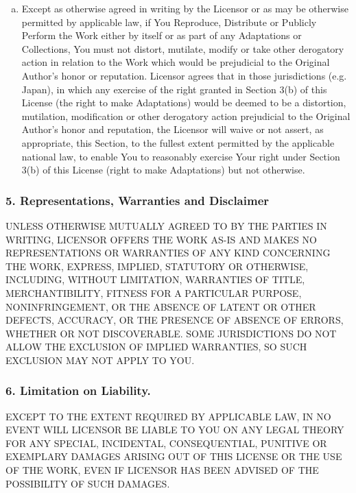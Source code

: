 \begin{enumerate}[a.]
          \item Except as otherwise agreed in writing by the Licensor
          or as may be otherwise permitted by applicable law, if
          You Reproduce, Distribute or Publicly Perform the Work
          either by itself or as part of any Adaptations or
          Collections, You must not distort, mutilate, modify or
          take other derogatory action in relation to the Work
          which would be prejudicial to the Original Author's honor
          or reputation. Licensor agrees that in those
          jurisdictions (e.g. Japan), in which any exercise of the
          right granted in Section 3(b) of this License (the right
          to make Adaptations) would be deemed to be a distortion,
          mutilation, modification or other derogatory action
          prejudicial to the Original Author's honor and
          reputation, the Licensor will waive or not assert, as
          appropriate, this Section, to the fullest extent
          permitted by the applicable national law, to enable You
          to reasonably exercise Your right under Section 3(b) of
          this License (right to make Adaptations) but not
          otherwise.

\end{enumerate}

        \subsubsection{5. Representations, Warranties and
        Disclaimer}

        UNLESS OTHERWISE MUTUALLY AGREED TO BY THE PARTIES IN
        WRITING, LICENSOR OFFERS THE WORK AS-IS AND MAKES NO
        REPRESENTATIONS OR WARRANTIES OF ANY KIND CONCERNING THE
        WORK, EXPRESS, IMPLIED, STATUTORY OR OTHERWISE, INCLUDING,
        WITHOUT LIMITATION, WARRANTIES OF TITLE, MERCHANTIBILITY,
        FITNESS FOR A PARTICULAR PURPOSE, NONINFRINGEMENT, OR THE
        ABSENCE OF LATENT OR OTHER DEFECTS, ACCURACY, OR THE
        PRESENCE OF ABSENCE OF ERRORS, WHETHER OR NOT DISCOVERABLE.
        SOME JURISDICTIONS DO NOT ALLOW THE EXCLUSION OF IMPLIED
        WARRANTIES, SO SUCH EXCLUSION MAY NOT APPLY TO YOU.

        \subsubsection{6. Limitation on Liability.} EXCEPT TO
        THE EXTENT REQUIRED BY APPLICABLE LAW, IN NO EVENT WILL
        LICENSOR BE LIABLE TO YOU ON ANY LEGAL THEORY FOR ANY
        SPECIAL, INCIDENTAL, CONSEQUENTIAL, PUNITIVE OR EXEMPLARY
        DAMAGES ARISING OUT OF THIS LICENSE OR THE USE OF THE WORK,
        EVEN IF LICENSOR HAS BEEN ADVISED OF THE POSSIBILITY OF
        SUCH DAMAGES.

